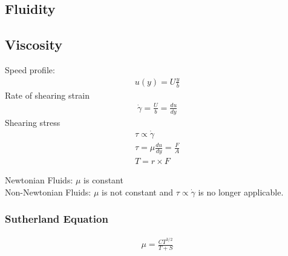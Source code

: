 \documentclass[a4paper]{amsart}
\begin{document}
\begin{comment}
	The behavior of a flowing fluid depends on various fluid properties. Viscosity, one 
	of the important properties, is responsible for the shear force produced in a moving 
	fluid. 
	Although the two fluids shown look alike (both are clear liquids and have a specific 
	gravity of 1), they behave very differently when set into motion. The very viscous 
	silicone oil is approximately 10,000 times more viscous than the water
	\subsection{No-slip condition}
	As a fluid flows near a solid surface, it "sticks" to the surface, i.e., the fluid matches the 
	velocity of the surface. This so-called "no-slip" condition is a very important one that must 
	be satisfied in any accurate analysis of fluid flow phenomena. 
	Dye injected at the bottom of a channel through which water is flowing forms a stagnant 
	layer near the bottom due to the noslip condition. As the dye filament is moved away from 
	the bottom, the motion of the water is clearly apparent. A significant velocity gradient is 
	created near the bottom.	
\end{comment}
\subsection{Fluidity}

\subsection{Viscosity}
Speed profile:
\begin{eqnarray*}
	u(y)=U\frac{y}{b}
\end{eqnarray*}
Rate of shearing strain
\begin{eqnarray*}
	\dot \gamma = \frac{U}{b}=\frac{du}{dy}
\end{eqnarray*}
Shearing stress
\begin{eqnarray*}
	\tau \propto \dot\gamma\\
	\tau=\mu\frac{du}{dy}=\frac{F}{A}\\
	T=r\times F
\end{eqnarray*}

Newtonian Fluids: $\mu$ is constant
\\
Non-Newtonian Fluids: $\mu$ is not constant and $\tau\propto\dot\gamma$ is no longer applicable.
\subsubsection{Sutherland Equation}
\begin{eqnarray*}
	\mu=\frac{CT^{3/2}}{T+S}
\end{eqnarray*}
\end{document}
